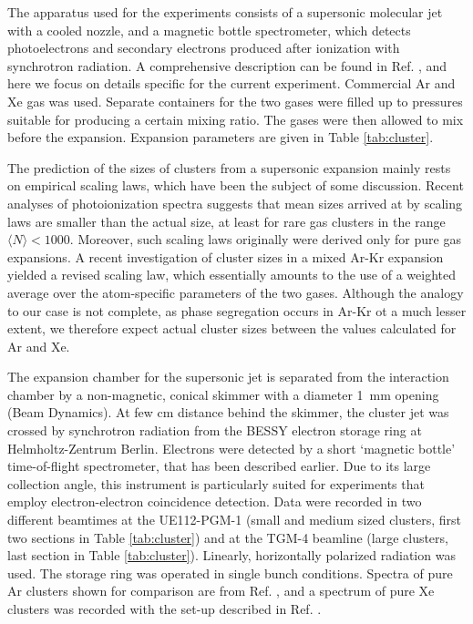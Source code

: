 %
%
The apparatus used for the experiments consists of a supersonic molecular jet with a cooled nozzle, and a magnetic bottle spectrometer, which detects photoelectrons and secondary electrons produced after ionization with synchrotron radiation.\cite{arion} 
A comprehensive description can be found in Ref. , and here we focus on details specific for the current experiment. Commercial Ar and Xe gas was used. 
Separate containers for the two gases were filled up to pressures suitable for producing a certain mixing ratio. The gases were then allowed to mix before the expansion. 
Expansion parameters are given in Table \ref{tab:cluster}.

The prediction of the sizes of clusters from a supersonic expansion mainly rests on empirical scaling laws,\cite{hagena1981} which have been the subject of some discussion.
Recent analyses of photoionization spectra suggests that mean sizes arrived at by scaling laws are smaller than the actual size, at least for rare gas clusters in the range $\langle N\rangle < 1000$.\cite{bergersen,hergenhahnprb,foerstel_arg2_2011}
Moreover, such scaling laws originally were derived only for pure gas expansions.
A recent investigation of cluster sizes in a mixed Ar-Kr expansion yielded a revised scaling law, which essentially amounts to the use of a weighted average over the atom-specific parameters of the two gases.\cite{danylchenko2015} 
Although the analogy to our case is not complete, as phase segregation occurs in Ar-Kr ot a much lesser extent, we therefore expect actual cluster sizes between the values calculated for Ar and Xe.

The expansion chamber for the supersonic jet is separated from the interaction chamber by a non-magnetic, conical skimmer with a diameter 1~mm opening (Beam Dynamics). 
At few cm distance behind the skimmer, the cluster jet was crossed by synchrotron radiation from the BESSY electron storage ring at Helmholtz-Zentrum Berlin. 
Electrons were detected by a short `magnetic bottle' time-of-flight spectrometer, that has been described earlier.\cite{mucke_review}
Due to its large collection angle, this instrument is particularly suited for experiments that employ electron-electron coincidence detection.
Data were recorded in two different beamtimes at the UE112-PGM-1 (small and medium sized clusters, first two sections in Table \ref{tab:cluster}) and at the TGM-4 beamline (large clusters, last section in Table \ref{tab:cluster}). 
Linearly, horizontally polarized radiation was used. 
The storage ring was operated in single bunch conditions.
Spectra of pure Ar clusters shown for comparison are from Ref. , and a spectrum of pure Xe clusters was recorded with the set-up described in Ref. .
